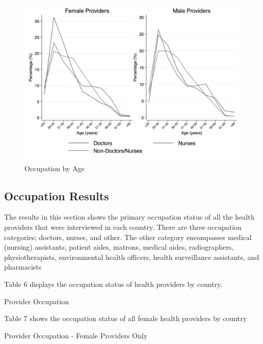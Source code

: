 \documentclass{article}                 %
\begin{document}
			\begin{figure}[H] 
				\centering
				\caption{Occupation by Age} 
				\includegraphics[width=\textwidth]{"../Output/Final/Line plots/occupation_gender"}
			\end{figure}	


	\subsection*{Occupation Results}
	
	The results in this section shows the primary occupation status of all the health providers that were interviewed in each country. There are three occupation categories; doctors, nurses, and other. The other category encompasses medical (nursing) assistants, patient aides, matrons, medical aides, radiographers, physiotherapists, environmental health officers, health surveillance assistants, and pharmacists 
	
	
	Table 6 displays the occupation status of health providers by country.
	
			\begin{table}[H]
				\centering
				\caption{Provider Occupation}
				
			\end{table}
		
	Table 7 shows the occupation status of all female health providers by country 
		
			\begin{table}[H]
				\centering
				\caption{Provider Occupation - Female Providers Only}
				
			\end{table}
		
\end{document}
